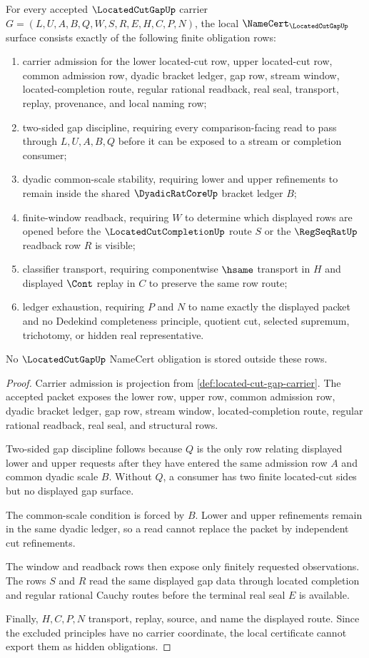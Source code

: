 \begin{theorem}\label{thm:located-cut-gap-namecert-obligations}
For every accepted $\LocatedCutGapUp$ carrier $G=(L,U,A,B,Q,W,S,R,E,H,C,P,N)$, the local $\NameCert_{\LocatedCutGapUp}$ surface consists exactly of the following finite obligation rows:
\begin{enumerate}
\item carrier admission for the lower located-cut row, upper located-cut row, common admission row, dyadic bracket ledger, gap row, stream window, located-completion route, regular rational readback, real seal, transport, replay, provenance, and local naming row;
\item two-sided gap discipline, requiring every comparison-facing read to pass through $L,U,A,B,Q$ before it can be exposed to a stream or completion consumer;
\item dyadic common-scale stability, requiring lower and upper refinements to remain inside the shared $\DyadicRatCoreUp$ bracket ledger $B$;
\item finite-window readback, requiring $W$ to determine which displayed rows are opened before the $\LocatedCutCompletionUp$ route $S$ or the $\RegSeqRatUp$ readback row $R$ is visible;
\item classifier transport, requiring componentwise $\hsame$ transport in $H$ and displayed $\Cont$ replay in $C$ to preserve the same row route;
\item ledger exhaustion, requiring $P$ and $N$ to name exactly the displayed packet and no Dedekind completeness principle, quotient cut, selected supremum, trichotomy, or hidden real representative.
\end{enumerate}
No $\LocatedCutGapUp$ NameCert obligation is stored outside these rows.
\end{theorem}
\begin{proof}
Carrier admission is projection from \autoref{def:located-cut-gap-carrier}. The accepted packet exposes the lower row, upper row, common admission row, dyadic bracket ledger, gap row, stream window, located-completion route, regular rational readback, real seal, and structural rows.

Two-sided gap discipline follows because $Q$ is the only row relating displayed lower and upper requests after they have entered the same admission row $A$ and common dyadic scale $B$. Without $Q$, a consumer has two finite located-cut sides but no displayed gap surface.

The common-scale condition is forced by $B$. Lower and upper refinements remain in the same dyadic ledger, so a read cannot replace the packet by independent cut refinements.

The window and readback rows then expose only finitely requested observations. The rows $S$ and $R$ read the same displayed gap data through located completion and regular rational Cauchy routes before the terminal real seal $E$ is available.

Finally, $H,C,P,N$ transport, replay, source, and name the displayed route. Since the excluded principles have no carrier coordinate, the local certificate cannot export them as hidden obligations.
\end{proof}

